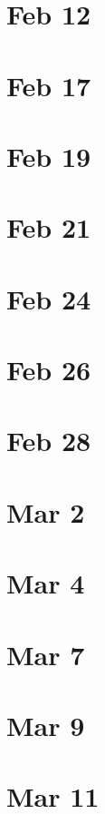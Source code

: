 \documentclass{amsart}
\newcommand{\<}{\langle}
\renewcommand{\>}{\rangle}
\numberwithin{equation}{section}
\theoremstyle{plain}
\theoremstyle{definition}
\theoremstyle{remark}
\begin{document}
\section{Feb 12}

\section{Feb 17}

\section{Feb 19}

\section{Feb 21}

\section{Feb 24}

\section{Feb 26}

\section{Feb 28}

\section{Mar 2}

\section{Mar 4}

\section{Mar 7}

\section{Mar 9}

\section{Mar 11}
\end{document}
